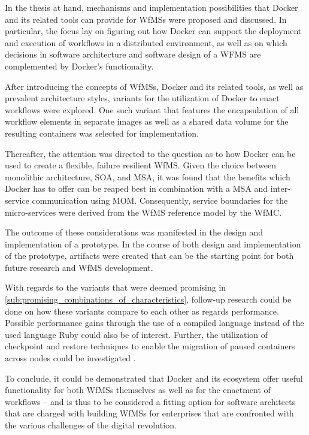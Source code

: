 
In the thesis at hand, mechanisms and implementation possibilities that Docker and its related tools can provide for \acp{WfMS} were proposed and discussed. In particular, the focus lay on figuring out how Docker can support the deployment and execution of workflows in a distributed environment, as well as on which decisions in software architecture and software design of a WFMS are complemented by Docker's functionality.

After introducing the concepts of \acp{WfMS}, Docker and its related tools, as well as prevalent architecture styles, variants for the utilization of Docker to enact workflows were explored. One such variant that features the encapsulation of all workflow elements in separate images as well as a shared data volume for the resulting containers was selected for implementation.

Thereafter, the attention was directed to the question as to how Docker can be used to create a flexible, failure resilient \ac{WfMS}. Given the choice between monolithic architecture, \ac{SOA}, and \ac{MSA}, it was found that the benefits which Docker has to offer can be reaped best in combination with a \ac{MSA} and inter-service communication using \ac{MOM}. Consequently, service boundaries for the micro-services were derived from the \ac{WfMS} reference model by the \ac{WfMC}.

The outcome of these considerations was manifested in the design and implementation of a prototype. In the course of both design and implementation of the prototype, artifacts were created that can be the starting point for both future research and \ac{WfMS} development.

With regards to the variants that were deemed promising in \ref{sub:promising_combinations_of_characteristics}, follow-up research could be done on how these variants compare to each other as regards performance. Possible performance gains through the use of a compiled language instead of the used language Ruby could also be of interest. Further, the utilization of checkpoint and restore techniques to enable the migration of paused containers across nodes could be investigated \cite{Kim2015Checkpoint,Merker2015How}.

To conclude, it could be demonstrated that Docker and its ecosystem offer useful functionality for both \acp{WfMS} themselves as well as for the enactment of workflows – and is thus to be considered a fitting option for software architects that are charged with building \acp{WfMS} for enterprises that are confronted with the various challenges of the digital revolution.
